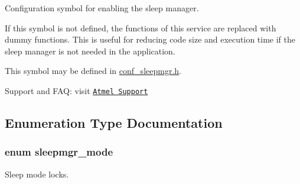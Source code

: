 Configuration symbol for enabling the sleep manager. 

If this symbol is not defined, the functions of this service are replaced with dummy functions. This is useful for reducing code size and execution time if the sleep manager is not needed in the application.

This symbol may be defined in \hyperlink{conf__sleepmgr_8h}{conf\-\_\-sleepmgr.\-h}.

Support and F\-A\-Q\-: visit \href{http://www.atmel.com/design-support/}{\tt Atmel Support} 

\subsection{Enumeration Type Documentation}
\hypertarget{group__sleepmgr__group_gaa990bc3ea16fcad09009cdc70dbc38c6}{
\subsubsection[{sleepmgr\-\_\-mode}]{\setlength{\rightskip}{0pt plus 5cm}enum {\bf sleepmgr\-\_\-mode}}}\label{group__sleepmgr__group_gaa990bc3ea16fcad09009cdc70dbc38c6}


Sleep mode locks. 


